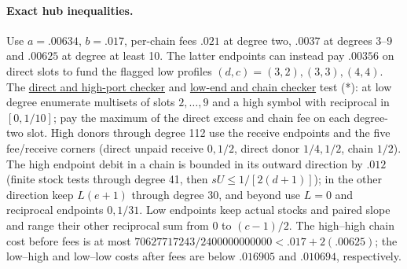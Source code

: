 \documentclass[11pt]{article}
\newcommand{\proofsrc}[2]{\href{https://github.com/uzay-eth/friend-tree-exponent/blob/a0972085ad72ad5685ae7b424988648d1965e73c/#1}{#2}}
\theoremstyle{remark}
\numberwithin{equation}{section}
\begin{document}
\paragraph{Exact hub inequalities.}
Use $a=.00634$, $b=.017$, per-chain fees $.021$ at degree two, $.0037$ at degrees 3--9 and $.00625$ at degree at least 10. The latter endpoints can instead pay $.00356$ on direct slots to fund the flagged low profiles $(d,c)=(3,2),(3,3),(4,4)$. The \proofsrc{round2/proofs/astra-late/source/round2/open/age-order/global-transport/hostile/edge-dual/check.py}{direct and high-port checker} and \proofsrc{round2/proofs/astra-late/source/round2/open/age-order/global-transport/hostile/interfaces/low-end.py}{low-end and chain checker} test (*): at low degree enumerate multisets of slots $2,\ldots,9$ and a high symbol with reciprocal in $[0,1/10]$; pay the maximum of the direct excess and chain fee on each degree-two slot. High donors through degree 112 use the receive endpoints and the five fee/receive corners (direct unpaid receive $0,1/2$, direct donor $1/4,1/2$, chain $1/2$). The high endpoint debit in a chain is bounded in its outward direction by $.012$ (finite stock tests through degree 41, then $sU\le1/[2(d+1)]$); in the other direction keep $L(e+1)$ through degree 30, and beyond use $L=0$ and reciprocal endpoints $0,1/31$. Low endpoints keep actual stocks and paired slope and range their other reciprocal sum from 0 to $(c-1)/2$. The high--high chain cost before fees is at most $70627717243/2400000000000<.017+2(.00625)$; the low--high and low--low costs after fees are below $.016905$ and $.010694$, respectively.
\end{document}
